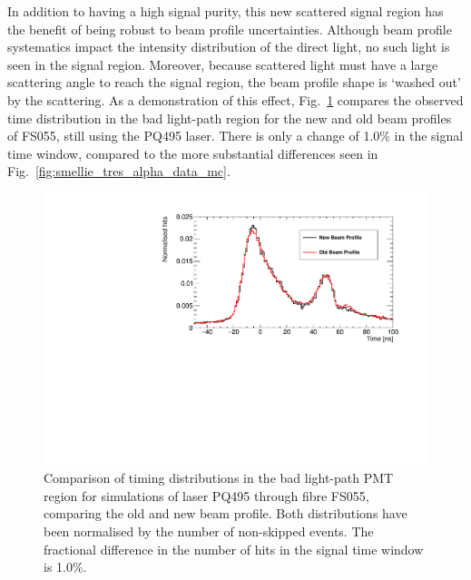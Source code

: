 In addition to having a high signal purity, this new scattered signal region has the benefit of being robust to beam profile uncertainties. Although beam profile systematics impact the intensity distribution of the direct light, no such light is seen in the signal region. Moreover, because scattered light must have a large scattering angle to reach the signal region, the beam profile shape is `washed out' by the scattering. As a demonstration of this effect, Fig.~\ref{fig:smellie_bad_lightpath_region_beamprofile_comparison} compares the observed time distribution in the bad light-path region for the new and old beam profiles of FS055, still using the PQ495 laser. There is only a change of 1.0\% in the signal time window, compared to the more substantial differences seen in Fig.~\ref{fig:smellie_tres_alpha_data_mc}.

\begin{figure}
    \centering
    \includegraphics[width=\textwidth]{5_SMELLIEAnalysis/images/FS055_PQ495_new_vs_old_beam_profile_bad_lightpath_timeplot.pdf}
    \caption[Comparison of timing distributions in the bad light-path PMT region for simulations of laser PQ495 through fibre FS055, comparing the old and new beam profile]
    {Comparison of timing distributions in the bad light-path PMT region for simulations of laser PQ495 through fibre FS055, comparing the old and new beam profile. Both distributions have been normalised by the number of non-skipped events. The fractional difference in the number of hits in the signal time window is 1.0\%.}
    \label{fig:smellie_bad_lightpath_region_beamprofile_comparison}
\end{figure}

